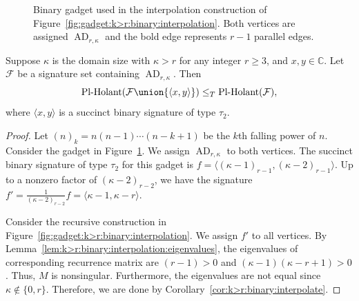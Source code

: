 \documentclass[11pt]{article}
\newcommand{\PlHolant}{\operatorname{Pl-Holant}}
\newcommand{\AD}{\operatorname{AD}}
\def\borderColor{blue!60}
\def\scale{0.6}
\def\nodeDist{1.4cm}
\begin{document}
\begin{figure}[t]
 \centering
 \caption{Binary gadget used in the interpolation construction of Figure~\ref{fig:gadget:k>r:binary:interpolation}.
 Both vertices are assigned $\AD_{r,\kappa}$ and the bold edge represents $r - 1$ parallel edges.}
 \label{fig:gadget:k>r:binary}
\end{figure}

\begin{lemma} \label{lem:k>r:edge_coloring:binary:interpolation}
 Suppose $\kappa$ is the domain size with $\kappa > r$ for any integer $r \ge 3$, and $x,y \in \mathbb{C}$.
 Let $\mathcal{F}$ be a signature set containing $\AD_{r,\kappa}$.
 Then
 \[
  \PlHolant(\mathcal{F} \union \{\langle x,y \rangle\}) \le_T \PlHolant(\mathcal{F}),
 \]
 where $\langle x,y \rangle$ is a succinct binary signature of type $\tau_2$.
\end{lemma}

\begin{proof}
 Let $(n)_k = n (n-1) \dotsm (n-k+1)$ be the $k$th falling power of $n$.
 Consider the gadget in Figure~\ref{fig:gadget:k>r:binary}.
 We assign $\AD_{r,\kappa}$ to both vertices.
 The succinct binary signature of type $\tau_2$ for this gadget is
 $f = \langle (\kappa - 1)_{r - 1}, (\kappa - 2)_{r - 1} \rangle$.
 Up to a nonzero factor of $(\kappa - 2)_{r - 2}$,
 we have the signature $f' = \frac{1}{(\kappa - 2)_{r - 2}} f = \langle \kappa - 1, \kappa - r \rangle$.
 
 Consider the recursive construction in Figure~\ref{fig:gadget:k>r:binary:interpolation}.
 We assign $f'$ to all vertices.
 By Lemma~\ref{lem:k>r:binary:interpolation:eigenvalues},
 the eigenvalues of corresponding recurrence matrix are $(r - 1) > 0$ and $(\kappa - 1) (\kappa - r + 1) > 0$.
 Thus, $M$ is nonsingular.
 Furthermore, the eigenvalues are not equal since $\kappa \not\in \{0,r\}$.
 Therefore,
 we are done by Corollary~\ref{cor:k>r:binary:interpolate}.
\end{proof}
\end{document}
